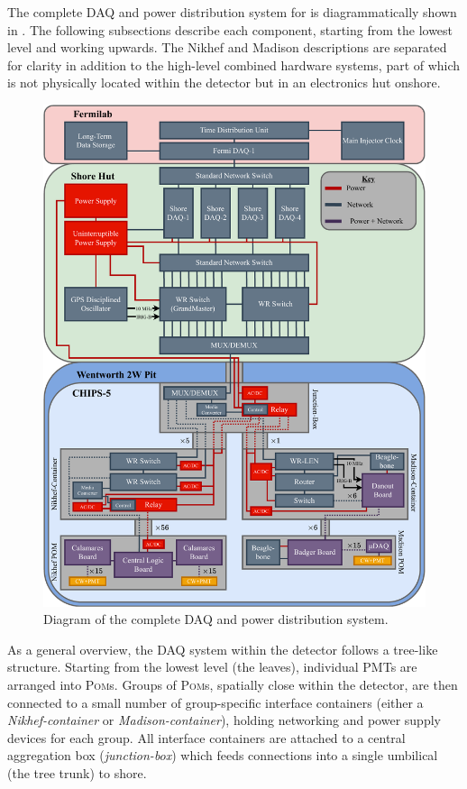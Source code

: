 The complete DAQ and power distribution system for \chipsfive is diagrammatically shown in
. The following subsections describe each component, starting from the lowest
level and working upwards. The Nikhef and Madison descriptions are separated for clarity in
addition to the high-level combined hardware systems, part of which is not physically located
within the detector but in an electronics hut onshore.

\begin{figure} %
    \includegraphics[width=\textwidth]{diagrams/5-daq/daq.pdf}
    \caption[Diagram of the complete \chipsfive data acquisition and power distribution system]
    {Diagram of the complete \chipsfive DAQ and power distribution system.}
    \label{fig:daq}
\end{figure}

As a general overview, the DAQ system within the detector follows a tree-like structure. Starting
from the lowest level (the leaves), individual PMTs are arranged into \textsc{Pom}s. Groups of
\textsc{Pom}s, spatially close within the detector, are then connected to a small number of
group-specific interface containers (either a \emph{Nikhef-container} or
\emph{Madison-container}), holding networking and power supply devices for each group. All
interface containers are attached to a central aggregation box (\emph{junction-box}) which feeds
connections into a single umbilical (the tree trunk) to shore.

